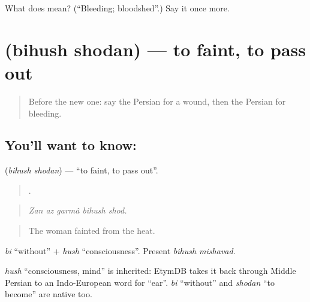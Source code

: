 \begin{tcolorbox}[breakable,colback=teal!4,colframe=teal!35!black,title={Before you move on}]
What does  mean? (\textquotedblleft{}Bleeding; bloodshed\textquotedblright{}.) Say it once more.
\end{tcolorbox}
\section[\texorpdfstring{\fa{بیهوش} \fa{شدن} (bihush shodan)}{بیهوش شدن (bihush shodan)}]{  (bihush shodan) — to faint, to pass out}

\label{lesson:FA-C326-bihush-shodan}



\begin{quote}
Before the new one: say the Persian for a wound, then the Persian for bleeding.
\end{quote}

\subsection*{You'll want to know:  }
\textbf{ } (\emph{bihush shodan}) — \textquotedblleft{}to faint, to pass out\textquotedblright{}.

\begin{quote}
    .
\end{quote}

\begin{quote}
\emph{Zan az garmâ bihush shod.}
\end{quote}

\begin{quote}
The woman fainted from the heat.
\end{quote}

\emph{bi} \textquotedblleft{}without\textquotedblright{} + \emph{hush} \textquotedblleft{}consciousness\textquotedblright{}. Present \emph{bihush mishavad}.

\begin{cousinweb}
\emph{hush} \textquotedblleft{}consciousness, mind\textquotedblright{} is inherited: EtymDB takes it back through Middle Persian to an Indo-European word for \textquotedblleft{}ear\textquotedblright{}. \emph{bi} \textquotedblleft{}without\textquotedblright{} and \emph{shodan} \textquotedblleft{}to become\textquotedblright{} are native too.
\end{cousinweb}

